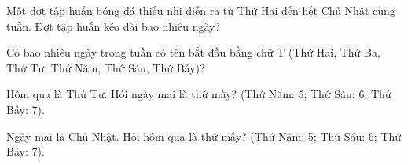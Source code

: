 \begin{ex} %
Một đợt tập huấn bóng đá thiếu nhi diễn ra từ Thứ Hai đến hết Chủ Nhật cùng tuần. Đợt tập huấn kéo dài bao nhiêu ngày?
\end{ex}

\begin{ex} %
Có bao nhiêu ngày trong tuần có tên bắt đầu bằng chữ T (Thứ Hai, Thứ Ba, Thứ Tư, Thứ Năm, Thứ Sáu, Thứ Bảy)?
\end{ex}

\begin{ex} %
Hôm qua là Thứ Tư. Hỏi ngày mai là thứ mấy? (Thứ Năm: 5; Thứ Sáu: 6; Thứ Bảy: 7).
\end{ex}

\begin{ex} %
Ngày mai là Chủ Nhật. Hỏi hôm qua là thứ mấy? (Thứ Năm: 5; Thứ Sáu: 6; Thứ Bảy: 7).
\end{ex}
